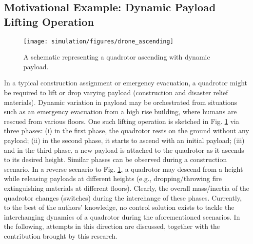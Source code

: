 \documentclass[AMA,STIX1COL,sort, compress]{WileyNJD-v2}
\begin{document}
\subsection{Motivational Example: Dynamic Payload Lifting Operation}
\begin{figure}[!h]
	\centering
	\texttt{[image: simulation/figures/drone\_ascending]}%
	\caption{{A schematic representing a quadrotor ascending with dynamic payload.}}\label{fig:mot} %
\end{figure}
In a typical construction assignment or emergency evacuation, a quadrotor might be required to lift or drop varying payload (construction and disaster relief materials). Dynamic variation in payload may be orchestrated from situations such as an emergency evacuation from a high rise building, where humans are rescued from various floors. One such lifting operation is sketched in Fig. \ref{fig:mot} via three phases: (i) in the first phase, the quadrotor rests on the ground without any payload; (ii) in the second phase, it starts to ascend with an initial payload; (iii) and in the third phase, a new payload is attached to the quadrotor as it ascends to its desired height. Similar phases can be observed during a construction scenario. In a reverse scenario to Fig. \ref{fig:mot}, a quadrotor may descend from a height while releasing payloads at different heights (e.g., dropping/throwing fire extinguishing materials at different floors). Clearly, the overall mass/inertia of the quadrotor changes (switches) during the interchange of these phases. Currently, to the best of the authors' knowledge, no control solution exists to tackle the interchanging dynamics of a quadrotor during the aforementioned scenarios. In the following, attempts in this direction are discussed, together with the contribution brought by this research.
\end{document}
